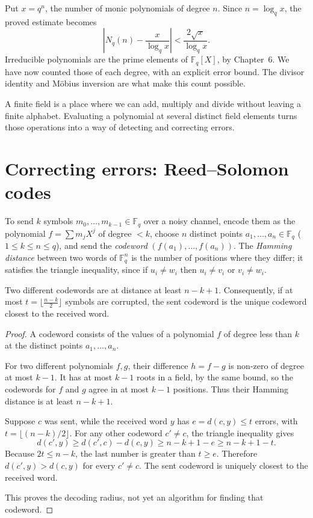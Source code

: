 \begin{remark}
Put $x=q^n$, the number of monic polynomials of degree $n$.
Since $n=\log_qx$, the proved estimate becomes
\[
\left|N_q(n)-\frac{x}{\log_qx}\right|
<\frac{2\sqrt{x}}{\log_qx}.
\]
Irreducible polynomials are the prime elements of $\mathbb F_q[X]$,
by Chapter~6. We have now counted those of each degree, with an
explicit error bound. The divisor identity and M\"obius inversion
are what make this count possible.
\end{remark}

A finite field is a place where we can add, multiply and divide without leaving a finite alphabet. Evaluating a polynomial at several distinct field elements turns those operations into a way of detecting and correcting errors.

\section{Correcting errors: Reed–Solomon codes}

To send $k$ symbols $m_0,\dots,m_{k-1}\in\mathbb F_q$ over a noisy channel, encode them as the polynomial $f=\sum m_jX^j$ of degree $<k$, choose $n$ distinct points $a_1,\dots,a_n\in\mathbb F_q$ ($1\le k\le n\le q$), and send the \emph{codeword} $(f(a_1),\dots,f(a_n))$. The \emph{Hamming distance} between two words of $\mathbb F_q^n$ is the number of positions where they differ; it satisfies the triangle inequality, since if $u_i\ne w_i$ then $u_i\ne v_i$ or $v_i\ne w_i$.

\begin{proposition}\label{prop:rsdist}
Two different codewords are at distance at least $n-k+1$. Consequently, if at most $t=\lfloor\frac{n-k}2\rfloor$ symbols are corrupted, the sent codeword is the unique codeword closest to the received word.
\end{proposition}
\begin{proof}
A codeword consists of the values of a polynomial
$f$ of degree less than $k$ at the distinct points
$a_1,\ldots,a_n$.

For two different polynomials $f,g$, their difference
$h=f-g$ is non-zero of degree at most $k-1$.
It has at most $k-1$ roots in a field, by the same bound, so the
codewords for $f$ and $g$ agree in at most $k-1$
positions. Thus their Hamming distance is at least
$\boxed{n-k+1}$.

Suppose $c$ was sent, while the received word $y$
has $e=d(c,y)\le t$ errors, with
$t=\lfloor(n-k)/2\rfloor$.
For any other codeword $c'\ne c$,
the triangle inequality gives
\[
d(c',y)\ge d(c',c)-d(c,y)
\ge n-k+1-e\ge n-k+1-t.
\]
Because $2t\le n-k$, the last number is greater
than $t\ge e$.
Therefore $d(c',y)>d(c,y)$ for every $c'\ne c$.
The sent codeword is uniquely closest to the
received word.

This proves the decoding radius, not yet an
algorithm for finding that codeword.
\end{proof}

